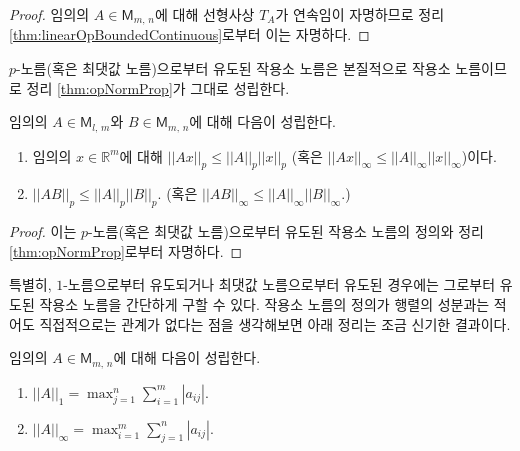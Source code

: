\begin{proof}
    임의의 $A\in\mathsf{M}_{m,\,n}$에 대해 선형사상 $T_A$가 연속임이 자명하므로 정리 \ref{thm:linearOpBoundedContinuous}로부터 이는 자명하다.
\end{proof}

$p$-노름(혹은 최댓값 노름)으로부터 유도된 작용소 노름은 본질적으로 작용소 노름이므로 정리 \ref{thm:opNormProp}가 그대로 성립한다.

\begin{theorem}
    임의의 $A\in\mathsf{M}_{l,\,m}$와 $B\in\mathsf{M}_{m,\,n}$에 대해 다음이 성립한다.
    \begin{enumerate}
        \item 임의의 $x\in\mathbb{R}^m$에 대해 $||Ax||_p\leq||A||_p||x||_p$ (혹은 $||Ax||_\infty\leq||A||_\infty||x||_\infty$)이다.
        \item $||AB||_p\leq||A||_p||B||_p$. (혹은 $||AB||_\infty\leq||A||_\infty||B||_\infty$.)
    \end{enumerate}
\end{theorem}

\begin{proof}
    이는 $p$-노름(혹은 최댓값 노름)으로부터 유도된 작용소 노름의 정의와 정리 \ref{thm:opNormProp}로부터 자명하다.
\end{proof}

특별히, $1$-노름으로부터 유도되거나 최댓값 노름으로부터 유도된 경우에는 그로부터 유도된 작용소 노름을 간단하게 구할 수 있다. 작용소 노름의 정의가 행렬의 성분과는 적어도 직접적으로는 관계가 없다는 점을 생각해보면 아래 정리는 조금 신기한 결과이다.

\begin{theorem}
    임의의 $A\in\mathsf{M}_{m,\,n}$에 대해 다음이 성립한다.
    \begin{enumerate}
        \item $||A||_1=\max_{j=1}^n\sum_{i=1}^m|a_{ij}|$.
        \item $||A||_\infty=\max_{i=1}^m\sum_{j=1}^n|a_{ij}|$.
    \end{enumerate}
\end{theorem}

